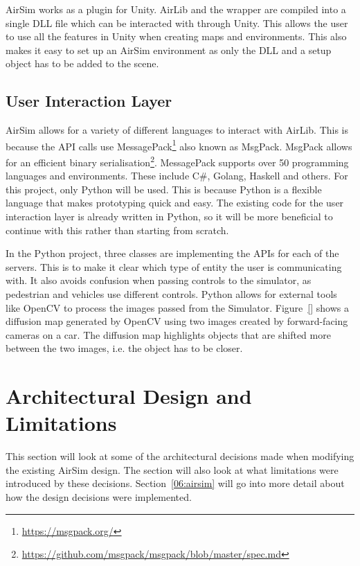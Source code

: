 AirSim works as a plugin for Unity. AirLib and the wrapper are compiled into a single DLL file which can be interacted with through Unity. This allows the user to use all the features in Unity when creating maps and environments. This also makes it easy to set up an AirSim environment as only the DLL and a setup object has to be added to the scene.  


\subsection{User Interaction Layer} \label{05:UIL}
AirSim allows for a variety of different languages to interact with AirLib. This is because the API calls use MessagePack\footnote{\url{https://msgpack.org/}} also known as MsgPack. MsgPack allows for an efficient binary serialisation\footnote{\url{https://github.com/msgpack/msgpack/blob/master/spec.md}}. MessagePack supports over 50 programming languages and environments. These include C\#, Golang, Haskell and others.  For this project, only Python will be used. This is because Python is a flexible language that makes prototyping quick and easy. The existing code for the user interaction layer is already written in Python, so it will be more beneficial to continue with this rather than starting from scratch.

In the Python project, three classes are implementing the APIs for each of the servers. This is to make it clear which type of entity the user is communicating with. It also avoids confusion when passing controls to the simulator, as pedestrian and vehicles use different controls. Python allows for external tools like OpenCV to process the images passed from the Simulator. Figure~\ref{} shows a diffusion map generated by OpenCV using two images created by forward-facing cameras on a car. The diffusion map highlights objects that are shifted more between the two images, i.e. the object has to be closer. 









\section{Architectural Design and Limitations} \label{05:ArchitecturalDesign}
This section will look at some of the architectural decisions made when modifying the existing AirSim design. The section will also look at what limitations were introduced by these decisions. Section~\ref{06:airsim} will go into more detail about how the design decisions were implemented. 


